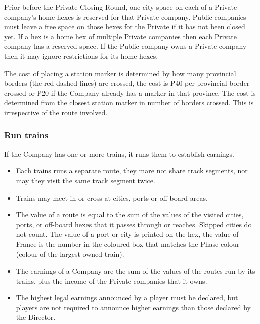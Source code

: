 \documentclass[a4paper,twocolumn]{article}
\begin{document}
Prior before the Private Closing Round, one city space on each of a Private
company's home hexes is reserved for that Private company. Public companies must
leave a free space on those hexes for the Private if it has not been closed yet.
If a hex is a home hex of multiple Private companies then each Private company
has a reserved space. If the Public company owns a Private company then it may
ignore restrictions for its home hexes.

The cost of placing a station marker is determined by how many provincial
borders (the red dashed lines) are crossed, the cost is P40 per provincial
border crossed or P20 if the Company already has a marker in that province. The
cost is determined from the closest station marker in number of borders crossed.
This is irrespective of the route involved.

\subsubsection{Run trains}
If the Company has one or more trains, it runs them to establish earnings.
\begin{itemize}
	\item Each trains runs a separate route, they mare not share track segments,
	nor may they visit the same track segment twice.
	\item Trains may meet in or cross at cities, ports or off-board areas.
	\item The value of a route is equal to the sum of the values of the visited
	cities, ports, or off-board hexes that it passes through or reaches. Skipped
	cities do not count. The value of a port or city is printed on the hex, the
	value of France is the number in the coloured box that matches the Phase
	colour (colour of the largest owned train).
	\item The earnings of a Company are the sum of the values of the routes run
	by its trains, plus the income of the Private companies that it owns.
	\item The highest legal earnings announced by a player must be declared, but
	players are not required to announce higher earnings than those declared by
	the Director.
\end{itemize}
\end{document}

